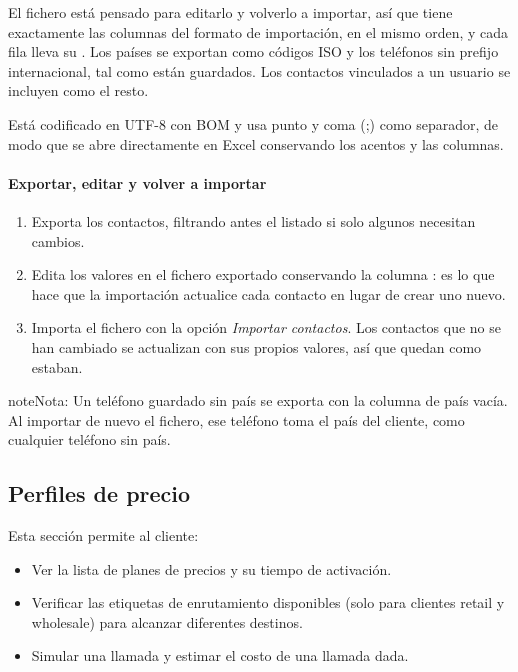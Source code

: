 \documentclass[letterpaper,10pt,spanish]{sphinxmanual}
\begin{document}
El fichero está pensado para editarlo y volverlo a importar, así que tiene exactamente las columnas del formato de importación, en el mismo orden, y cada fila lleva su . Los países se exportan como códigos ISO y los teléfonos sin prefijo internacional, tal como están guardados. Los contactos vinculados a un usuario se incluyen como el resto.

Está codificado en UTF-8 con BOM y usa punto y coma (;) como separador, de modo que se abre directamente en Excel conservando los acentos y las columnas.
\paragraph{Exportar, editar y volver a importar}
\begin{enumerate}
\item {} 
Exporta los contactos, filtrando antes el listado si solo algunos necesitan cambios.

\item {} 
Edita los valores en el fichero exportado conservando la columna : es lo que hace que la importación actualice cada contacto en lugar de crear uno nuevo.

\item {} 
Importa el fichero con la opción \emph{Importar contactos}. Los contactos que no se han cambiado se actualizan con sus propios valores, así que quedan como estaban.

\end{enumerate}

\begin{notice}{note}{Nota:}
Un teléfono guardado sin país se exporta con la columna de país vacía. Al importar de nuevo el fichero, ese teléfono toma el país del cliente, como cualquier teléfono sin país.
\end{notice}


\subsection{Perfiles de precio}
\label{administration_portal/client/vpbx/rating_profiles:rating-profiles}\label{administration_portal/client/vpbx/rating_profiles::doc}
Esta sección permite al cliente:
\begin{itemize}
\item {} 
Ver la lista de planes de precios y su tiempo de activación.

\item {} 
Verificar las etiquetas de enrutamiento disponibles (solo para clientes retail y wholesale) para alcanzar diferentes destinos.

\item {} 
Simular una llamada y estimar el costo de una llamada dada.

\end{itemize}
\end{document}
